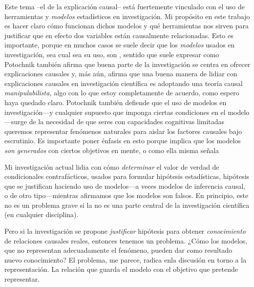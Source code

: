 {Este tema --el de la explicación causal-- está fuertemente
vinculado con el uso de herramientas y \emph{modelos}
estadísticos en investigación. Mi propósito en este trabajo
es hacer claro cómo funcionan dichos modelos y qué
herramientas nos sirven para justificar que en efecto dos
variables están causalmente relacionadas. Esto es
importante, porque en muchos casos se suele decir que los
\emph{modelos} usados en investigación, sea cual sea su uso,
son , sentido que suele expresar como
Potochnik también afirma que buena parte de la investigación se
centra en ofrecer explicaciones causales y, más aún, afirma que
una buena manera de lidiar con explicaciones causales en
investigación científica es adoptando una teoría causal
\emph{manipulabilista,} algo con lo que estoy completamente
de acuerdo, como espero haya quedado claro. Potochnik
también defiende que el uso de modelos en investigación---y
cualquier supuesto que imponga ciertas condiciones en el
modelo---surge de la necesidad de que seres con capacidades
cognitivas limitadas queremos representar fenómenos
naturales para aislar los factores causales bajo escrutinio.
Es importante poner énfasis en esto porque implica que los
modelos \emph{son generados} con ciertos objetivos en mente,
o como ella misma señala 

Mi investigación actual lidia con cómo \emph{determinar} el
valor de verdad de condicionales contrafácticos, usados para
formular hipótesis estadísticas, hipótesis que se justifican
haciendo uso de modelos---a veces modelos de inferencia
causal, o de otro tipo---mientras afirmamos que los
modelos son falsos. En principio, este no es un problema
grave si la  no es una parte central de la
investigación científica (en cualquier disciplina).

Pero si la investigación se propone \emph{justificar}
hipótesis para obtener \emph{conocimiento} de relaciones
causales reales, entonces tenemos un problema. ¿Cómo los
modelos, que no representan adecuadamente el fenómeno,
pueden dar como resultado nuevo conocimiento? El problema,
me parece, radica enla discusión en torno a la
representación. La relación que guarda el modelo con el
objetivo que pretende representar.

}
